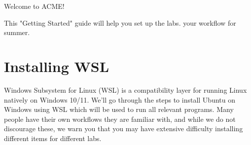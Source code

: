 \ifwindows
{}
\else
{}
\fi
Welcome to ACME!

\noindent This "Getting Started" guide will help you set up
\ifbootcamp
the labs.
\else
your workflow for summer.
\fi

\ifwindows
\section*{Installing WSL}

Windows Subsystem for Linux (WSL) is a compatibility layer for running Linux natively on Windows 10/11. 
We'll go through the steps to install Ubuntu on Windows using WSL which will be used to run all relevant programs.
Many people have their own workflows they are familiar with, and while we do not discourage these, we warn you that you may have extensive difficulty installing different items for different labs.

